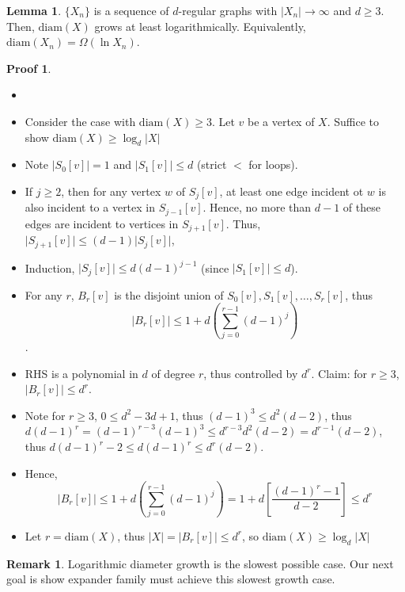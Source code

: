 \documentclass{book}
\newcommand{\diam}[1]{\textrm{diam}( #1 )}
\newcommand{\abs}[1]{\lvert #1 \rvert }
\theoremstyle{definition}
\newtheorem{lemma}{Lemma}[chapter]
\theoremstyle{remarkstyle}
\newtheorem*{remark}{Remark}%
\newtheorem*{myproof}{Proof}%
\begin{document}
\begin{lemma}
    $\{X_{n}\}$ is a sequence of $d$-regular graphs with $\abs{X_{n}} \rightarrow \infty $ and $d \ge 3$. Then, $\diam{X}$ grows at least logarithmically. Equivalently, $\diam{X_{n}} = \Omega(\ln X_{n})$. 
\end{lemma}
\begin{myproof}
    \begin{itemize}
        \item[]
        \item Consider the case with $\diam{X} \ge 3$. Let $v$ be a vertex of $X$. Suffice to show $\diam{X} \ge \log_{d}\abs{X} $
        \item Note $\abs{S_{0}[v]}=1$ and $\abs{S_{1}[v]}\le d$ (strict $<$ for loops). 
        \item If $j \ge 2$, then for any vertex $w$ of $S_{j}[v] $, at least one edge incident ot $w$ is also incident to a vertex in $S_{j-1}[v] $. Hence, no more than $d-1$ of these edges are incident to vertices in $S_{j+1}[v] $. Thus, $\abs{S_{j+1}[v]}\le (d-1)\abs{S_{j}[v]}$, 
        \item Induction, $\abs{S_{j}[v]} \le d(d-1)^{j-1}$ (since $\abs{S_{1}[v]}\le d$).
        \item For any $r$, $B_{r}[v] $ is the disjoint union of $S_{0}[v], S_{1}[v], \dots, S_{r}[v] $, thus $$\abs{B_{r}[v]} \le 1+d \left( \sum_{j=0}^{r-1} (d-1)^{j} \right) $$. 
        \item RHS is a polynomial in $d$ of degree $r$, thus controlled by $d^{r}$. Claim: for $r \ge 3$, $\abs{B_{r}[v]} \le d^{r} $. 
        \item Note for $r \ge 3$, $0 \le d^{2}-3d+1 $, thus $(d-1)^{3} \le d^{2}(d-2) $, thus $d(d-1)^{r} = (d-1)^{r-3}(d-1)^{3} \le d^{r-3}d^{2}(d-2) = d^{r-1}(d-2) $, thus $d(d-1)^{r}-2 \le d(d-1)^{r} \le d^{r}(d-2) $. 
        \item Hence, $$ \abs{B_{r}[v]} \le 1+d \left( \sum_{j=0}^{r-1} (d-1)^{j} \right) = 1 + d \left[ \frac{(d-1)^{r}-1}{d-2} \right] \le d^{r} $$
        \item Let $r = \diam{X} $, thus $\abs{X}=\abs{B_{r}[v]} \le d^{r} $, so $\diam{X} \ge \log_{d}\abs{X} $
    \end{itemize}
\end{myproof}
\begin{remark}
    Logarithmic diameter growth is the slowest possible case. Our next goal is show expander family must achieve this slowest growth case. \newline 
\end{remark}
\end{document}
